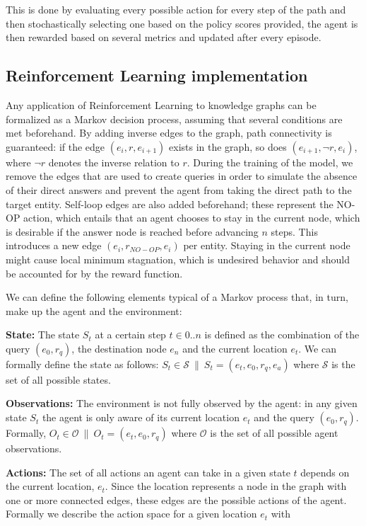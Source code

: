 This is done by evaluating every possible action for every step of the path and then stochastically selecting one based on the policy scores provided, the agent is then rewarded based on several metrics and updated after every episode.

\subsection{Reinforcement Learning implementation}\label{sec:spacerl-rlimplementation}

Any application of Reinforcement Learning to knowledge graphs can be formalized as a Markov decision process, assuming that several conditions are met beforehand. By adding inverse edges to the graph, path connectivity is guaranteed: if the edge $(e_i,r,e_{i+1})$ exists in the graph, so does $(e_{i+1},\neg r,e_i)$, where $\neg r$ denotes the inverse relation to $r$. During the training of the model, we remove the edges that are used to create queries in order to simulate the absence of their direct answers and prevent the agent from taking the direct path to the target entity. Self-loop edges are also added beforehand; these represent the NO-OP action, which entails that an agent chooses to stay in the current node, which is desirable if the answer node is reached before advancing $n$ steps. This introduces a new edge $(e_i,r_{NO-OP},e_i)$ per entity. Staying in the current node might cause local minimum stagnation, which is undesired behavior and should be accounted for by the reward function.

We can define the following elements typical of a Markov process that, in turn, make up the agent and the environment:

\textbf{State:} The state $S_t$ at a certain step $t \in 0..n$ is defined as the combination of the query $(e_0, r_q)$, the destination node $e_n$ and the current location $e_t$. We can formally define the state as follows: $S_t \in \mathcal{S} ~\|~ S_t = (e_t, e_0, r_q, e_a)$ where $\mathcal{S}$ is the set of all possible states.

\textbf{Observations:} The environment is not fully observed by the agent: in any given state $S_t$ the agent is only aware of its current location $e_t$ and the query $(e_0,r_q)$. Formally, $O_t \in \mathcal{O} ~\|~ O_t = (e_t, e_0, r_q)$ where $\mathcal{O}$ is the set of all possible agent observations.

\textbf{Actions:} The set of all actions an agent can take in a given state $t$ depends on the current location, $e_t$. Since the location represents a node in the graph with one or more connected edges, these edges are the possible actions of the agent. Formally we describe the action space for a given location $e_t$ with 

